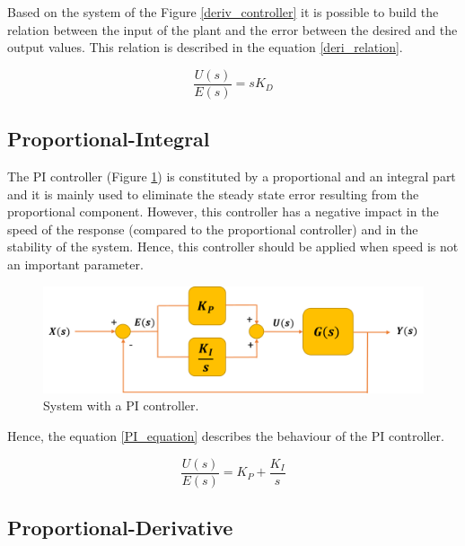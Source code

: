 Based on the system of the Figure \ref{deriv_controller} it is possible to build the relation between the input of the plant and the error between the desired and the output values. This relation is described in the equation \ref{deri_relation}.

\begin{equation}\label{deri_relation}
\frac{U(s)}{E(s)}= sK_D
\end{equation}

\subsection*{Proportional-Integral}

The PI controller (Figure \ref{PI_controller}) is constituted by a proportional and an integral part and it is mainly used to eliminate the steady state error resulting from the proportional component. However, this controller has a negative impact in the speed of the response (compared to the proportional controller) and in the stability of the system. Hence, this controller should be applied when speed is not an important parameter. %

\begin{figure}[H]
	\centering
	\includegraphics[scale=0.6]{figures/PI_controller.png}
	\caption{System with a PI controller.}
	\label{PI_controller}
\end{figure}

Hence, the equation \ref{PI_equation} describes the behaviour of the PI controller.

\begin{equation}\label{PI_equation}
\frac{U(s)}{E(s)}= K_P + \frac{K_I}{s}
\end{equation}

\subsection*{Proportional-Derivative}

